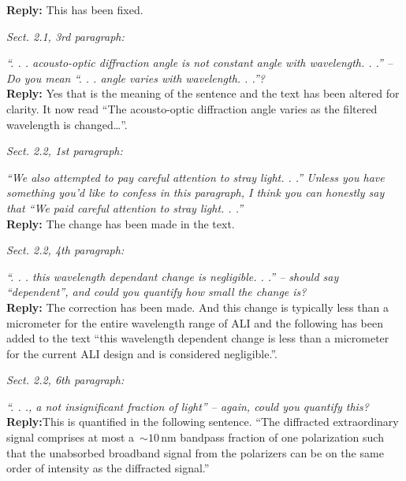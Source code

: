 \documentclass[12pt, notitlepage]{article}
\begin{document}
\textbf{Reply:} This has been fixed.

\hrulefill

\textit{Sect. 2.1, 3rd paragraph:}

\textit{``. . . acousto-optic diffraction angle is not constant angle with wavelength. . .'' – Do you
mean ``. . . angle varies with wavelength. . .''?}\\

\textbf{Reply:} Yes that is the meaning of the sentence and the text has been altered for clarity. It now read ``The acousto-optic diffraction angle varies as the filtered wavelength is changed\ldots''.

\hrulefill

\textit{Sect. 2.2, 1st paragraph:}

\textit{``We also attempted to pay careful attention to stray light. . .'' Unless you have something
you'd like to confess in this paragraph, I think you can honestly say that ``We paid careful
attention to stray light. . .''}\\

\textbf{Reply:} The change has been made in the text.

\hrulefill

\textit{Sect. 2.2, 4th paragraph:}

\textit{``. . . this wavelength dependant change is negligible. . .'' – should say ``dependent'', and
could you quantify how small the change is?}\\

\textbf{Reply:} The correction has been made. And this change is typically less than a micrometer for the entire wavelength range of ALI and the following has been added to the text ``this wavelength dependent change is less than a micrometer for the current ALI design and is considered negligible.''.

\hrulefill

\textit{Sect. 2.2, 6th paragraph:}

\textit{``. . ., a not insignificant fraction of light'' – again, could you quantify this?}\\

\textbf{Reply:}This is quantified in the following sentence. ``The diffracted extraordinary signal comprises at
most a~$\sim 10$\,nm bandpass fraction of one polarization such
that the unabsorbed broadband signal from the polarizers can be on the
same order of intensity as the diffracted signal.''

\hrulefill
\end{document}
